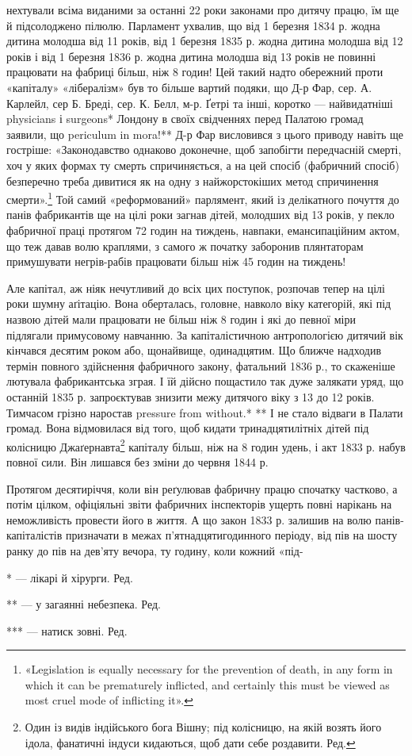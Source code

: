 нехтували всіма виданими за останні 22 роки законами про дитячу
працю, їм ще й підсолоджено пілюлю. Парламент ухвалив, що
від 1 березня 1834 р. жодна дитина молодша від 11 років, від
1 березня 1835 р. жодна дитина молодша від 12 років і від 1 березня
1836 р. жодна дитина молодша від 13 років не повинні
працювати на фабриці більш, ніж 8 годин! Цей такий надто обережний
проти «капіталу» «лібералізм» був то більше вартий
подяки, що Д-р Фар, сер. А. Карлейл, сер Б. Бреді, сер. К. Белл,
м-р. Ґетрі та інші, коротко — найвидатніші physicians і surgeons*
Лондону в своїх свідченнях перед Палатою громад заявили, що
periculum in mora!** Д-р Фар висловився з цього приводу навіть
ще гостріше: «Законодавство однаково доконечне, щоб запобігти
передчасній смерті, хоч у яких формах ту смерть спричиняється,
а на цей спосіб (фабричний спосіб) безперечно треба дивитися
як на одну з найжорстокіших метод спричинення смерти».\footnote{
«Legislation is equally necessary for the prevention of death, in
any form in which it can be prematurely inflicted, and certainly this must
be viewed as most cruel mode of inflicting it».
}
Той самий «реформований» парлямент, який із делікатного почуття
до панів фабрикантів ще на цілі роки загнав дітей, молодших
від 13 років, у пекло фабричної праці протягом 72 годин на
тиждень, навпаки, емансипаційним актом, що теж давав волю
краплями, з самого ж початку заборонив плянтаторам примушувати
негрів-рабів працювати більш ніж 45 годин на тиждень!

Але капітал, аж ніяк нечутливий до всіх цих поступок, розпочав
тепер на цілі роки шумну аґітацію. Вона оберталась, головне,
навколо віку категорій, які під назвою дітей мали працювати
не більш ніж 8 годин і які до певної міри підлягали примусовому
навчанню. За капіталістичною антропологією дитячий
вік кінчався десятим роком або, щонайвище, одинадцятим. Що
ближче надходив термін повного здійснення фабричного закону,
фатальний 1836 р., то скаженіше лютувала фабрикантська зграя.
І їй дійсно пощастило так дуже залякати уряд, що останній
1835 р. запроєктував знизити межу дитячого віку з 13 до 12 років.
Тимчасом грізно наростав pressure from without.* ** І не стало відваги
в Палати громад. Вона відмовилася від того, щоб кидати
тринадцятилітніх дітей під колісницю Джаґернавта\footnote*{
Один із видів індійського бога Вішну; під колісницю, на якій возять
його ідола, фанатичні індуси кидаються, щоб дати себе роздавити. Ред.
} капіталу
більш, ніж на 8 годин удень, і акт 1833 р. набув повної сили.
Він лишався без зміни до червня 1844 р.

Протягом десятиріччя, коли він реґулював фабричну працю
спочатку частково, а потім цілком, офіціяльні звіти фабричних
інспекторів ущерть повні нарікань на неможливість провести його
в життя. А що закон 1833 р. залишив на волю панів-капіталістів
призначати в межах п’ятнадцятигодинного періоду, від пів на шосту
ранку до пів на дев’яту вечора, ту годину, коли кожний «під-

* — лікарі й хірурги. Ред.

** — у загаянні небезпека. Ред.

*** — натиск зовні. Ред.